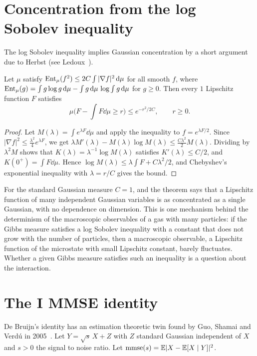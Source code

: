 \section{Concentration from the log Sobolev inequality}

The log Sobolev inequality implies Gaussian concentration by a short argument due to Herbst (see Ledoux~\cite{ledoux2001}).

\begin{theorem}[Herbst]
Let $\mu$ satisfy $\mathrm{Ent}_\mu(f^2)\leq2C\int|\nabla f|^2\,\mathrm{d}\mu$ for all smooth $f$, where $\mathrm{Ent}_\mu(g)=\int g\log g\,\mathrm{d}\mu-\int g\,\mathrm{d}\mu\,\log\int g\,\mathrm{d}\mu$ for $g\ge0$. Then every $1$ Lipschitz function $F$ satisfies
\[
\mu\Big(F-\int F\dd\mu\geq r\Big)\leq e^{-r^2/2C},\qquad r\geq0.
\]
\end{theorem}

\begin{proof}
Let $M(\lambda) = \int e^{\lambda F}\dd\mu$ and apply the inequality to $f = e^{\lambda F/2}$. Since $|\nabla f|^2\leq\frac{\lambda^2}{4}e^{\lambda F}$, we get $\lambda M'(\lambda)-M(\lambda)\log M(\lambda)\leq\frac{C\lambda^2}{2}M(\lambda)$. Dividing by $\lambda^2M$ shows that $K(\lambda) = \lambda^{-1}\log M(\lambda)$ satisfies $K'(\lambda)\leq C/2$, and $K(0^+) = \int F\dd\mu$. Hence $\log M(\lambda)\leq\lambda\int F+C\lambda^2/2$, and Chebyshev's exponential inequality with $\lambda = r/C$ gives the bound.
\end{proof}

For the standard Gaussian measure $C = 1$, and the theorem says that a Lipschitz function of many independent Gaussian variables is as concentrated as a single Gaussian, with no dependence on dimension. This is one mechanism behind the determinism of the macroscopic observables of a gas with many particles: if the Gibbs measure satisfies a log Sobolev inequality with a constant that does not grow with the number of particles, then a macroscopic observable, a Lipschitz function of the microstate with small Lipschitz constant, barely fluctuates. Whether a given Gibbs measure satisfies such an inequality is a question about the interaction.

\section{The I MMSE identity}\label{sec:immse}

De Bruijn's identity has an estimation theoretic twin found by Guo, Shamai and Verd\'u in 2005~\cite{guo2005}. Let $Y = \sqrt{s}\,X+Z$ with $Z$ standard Gaussian independent of $X$ and $s>0$ the signal to noise ratio. Let $\mathrm{mmse}(s) = \mathbb{E}|X-\mathbb{E}[X\mid Y]|^2$.

